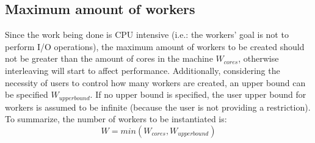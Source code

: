 \subsection{Maximum amount of workers}
Since the work being done is CPU intensive (i.e.: the workers' goal is not to perform I/O operations), the maximum amount of workers to be created should not be greater than the amount of cores in the machine \(W_{cores}\), otherwise interleaving will start to affect performance. Additionally, considering the necessity of users to control how many workers are created, an upper bound can be specified \(W_{upper bound}\). If no upper bound is specified, the user upper bound for workers is assumed to be infinite (because the user is not providing a restriction). To summarize, the number of workers to be instantiated is:
\[W = min(W_{cores}, W_{upper bound})\]

\pagebreak